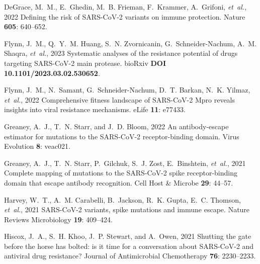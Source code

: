 \documentclass[9pt,twocolumn,twoside]{gsajnl_modified}
\begin{document}
{\begin{thebibliography}{76}
{DeGrace, M.~M., E.~Ghedin, M.~B. Frieman, F.~Krammer, A.~Grifoni, {\em
  et~al.\/}}, 2022 Defining the risk of {SARS-CoV-2} variants on immune
  protection. Nature {\bf 605}: 640--652.

{Flynn, J.~M., Q.~Y.~M. Huang, S.~N. Zvornicanin, G.~Schneider-Nachum, A.~M.
  Shaqra, {\em et~al.\/}}, 2023 Systematic analyses of the resistance potential
  of drugs targeting {SARS-CoV-2} main protease. bioRxiv {\bf DOI
  10.1101/2023.03.02.530652}.

{Flynn, J.~M., N.~Samant, G.~Schneider-Nachum, D.~T. Barkan, N.~K. Yilmaz, {\em
  et~al.\/}}, 2022 Comprehensive fitness landscape of {SARS-CoV-2 Mpro} reveals
  insights into viral resistance mechanisms. eLife {\bf 11}: e77433.

{Greaney, A.~J., T.~N. Starr, {\rm and} J.~D. Bloom}, 2022 An antibody-escape
  estimator for mutations to the {SARS-CoV-2} receptor-binding domain. Virus
  Evolution {\bf 8}: veac021.

{Greaney, A.~J., T.~N. Starr, P.~Gilchuk, S.~J. Zost, E.~Binshtein, {\em
  et~al.\/}}, 2021 Complete mapping of mutations to the {SARS-CoV-2} spike
  receptor-binding domain that escape antibody recognition. Cell Host \&
  Microbe {\bf 29}: 44--57.

{Harvey, W.~T., A.~M. Carabelli, B.~Jackson, R.~K. Gupta, E.~C. Thomson, {\em
  et~al.\/}}, 2021 {SARS-CoV-2} variants, spike mutations and immune escape.
  Nature Reviews Microbiology {\bf 19}: 409--424.

{Hiscox, J.~A., S.~H. Khoo, J.~P. Stewart, {\rm and} A.~Owen}, 2021 Shutting
  the gate before the horse has bolted: is it time for a conversation about
  {SARS-CoV-2} and antiviral drug resistance? Journal of Antimicrobial
  Chemotherapy {\bf 76}: 2230--2233.


\end{thebibliography}}
\end{document}
